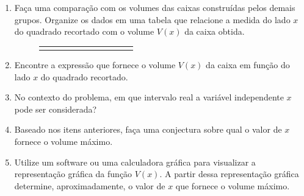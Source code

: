 \begin{project}
\begin{enumerate}
\item {} 
Faça uma comparação com os volumes das caixas construídas pelos demais grupos. Organize os dados em uma tabela que relacione a medida do lado \(x\) do quadrado recortado com o volume \(V(x)\) da caixa obtida.

\begin{figure}[H]
\begin{table}[H]
\centering
\begin{tabu} to \textwidth{|c|c|c|c|c|c|c|c|c|c|c|}
\hline
{} & & & & & & & & & & \\
\hline
{} & & & & & & & & & & \\
\hline
\end{tabu}
\end{table}
\end{figure}

\item {} 
Encontre a expressão que fornece o volume \(V(x)\) da caixa em função do lado \(x\) do quadrado recortado.

\item {} 
No contexto do problema, em que intervalo real a variável independente \(x\) pode ser considerada?

\item {} 
Baseado nos itens anteriores, faça uma conjectura sobre qual o valor de \(x\) fornece o volume máximo.

\item {} 
Utilize um software ou uma calculadora gráfica para visualizar a representação gráfica da função \(V(x)\). A partir dessa representação gráfica determine, aproximadamente, o valor de \(x\) que fornece o volume máximo.

\end{enumerate}
\end{project}

\exercise

\label{\detokenize{AF106-E2:sec-exercicios-grafico}}\label{\detokenize{AF106-E2:exercicios}}\label{\detokenize{AF106-E2::doc}}

